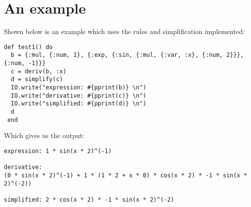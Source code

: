 \documentclass[a4paper,11pt]{article}
\begin{document}
\section*{An example}
Shown below is an example which uses the rules and simplification implemented:
\begin{verbatim}
def test1() do
  b = {:mul, {:num, 1}, {:exp, {:sin, {:mul, {:var, :x}, {:num, 2}}}, {:num, -1}}}
  c = deriv(b, :x)
  d = simplify(c)
  IO.write("expression: #{pprint(b)} \n")
  IO.write("derivative: #{pprint(c)} \n")
  IO.write("simplified: #{pprint(d)} \n")
  d
 end
\end{verbatim} 

Which gives us the output:
\begin{verbatim}
expression: 1 * sin(x * 2)^(-1) 

derivative: 
(0 * sin(x * 2)^(-1) + 1 * (1 * 2 + x * 0) * cos(x * 2) * -1 * sin(x * 2)^(-2)) 

simplified: 2 * cos(x * 2) * -1 * sin(x * 2)^(-2) 
\end{verbatim} 
\end{document}
